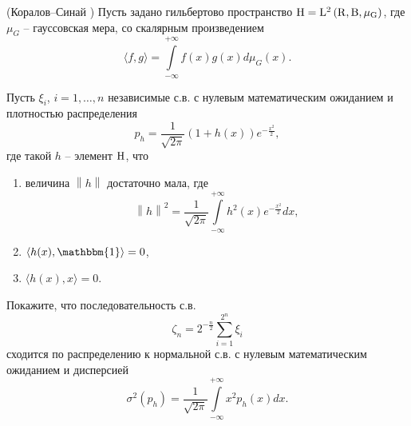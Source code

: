 \begin{problem}\Star(Коралов--Синай \cite{7})
Пусть задано гильбертово пространство
$\rm H = L^2\left( {{\rm R},{\rm B},\mu _G } \right)$, где $\mu _G$ --  
гауссовская мера, со скалярным произведением 
$$
\langle {f,g} 
\rangle=\int\limits_{-\infty }^{+\infty } 
{f(x)g(x)d\mu_G(x)}.
$$ 

Пусть $\xi _i $, $i=1,\dots,n$ независимые с.в. с нулевым математическим ожиданием и 
плотностью распределения 
$$
p_h =\frac{1}{\sqrt {2\pi } }\left( {1+h(x)} 
\right)e^{-\frac{x^2}{2}},
$$ где такой $h$ -- элемент $\rm H$, что
\begin{enumerate}
\item величина $\left\| h \right\|$ достаточно мала, 
где 
$$\left\| h \right\|^2=\frac{1}{\sqrt {2\pi } }\int\limits_{-\infty }^{+\infty } 
{h^2(x)e^{-\frac{x^2}{2}}dx},$$

\item $\langle h(x),\mathbbm{1} \rangle=0$,

\item $\langle {h(x),x} \rangle=0$.

\end{enumerate}
Покажите, что последовательность с.в. 
$$
\zeta _n 
=2^{-\frac{n}{2}}\sum\limits_{i=1}^{2^n} {\xi _i } 
$$ 
сходится 
по распределению к нормальной с.в. с нулевым математическим ожиданием и 
дисперсией 
$$
\sigma ^2(p_h )=\frac{1}{\sqrt {2\pi } }\int\limits_{-\infty 
}^{+\infty } {x^2p_h (x)dx}.$$

\end{problem}
